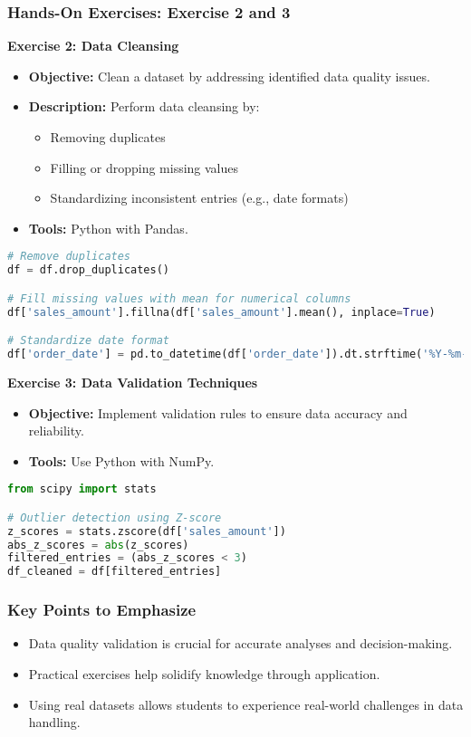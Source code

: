 \documentclass[aspectratio=169]{beamer}
\begin{document}
\begin{frame}[fragile]
    \frametitle{Hands-On Exercises: Exercise 2 and 3}
    \textbf{Exercise 2: Data Cleansing}
    \begin{itemize}
        \item \textbf{Objective:} Clean a dataset by addressing identified data quality issues.
        \item \textbf{Description:} Perform data cleansing by:
            \begin{itemize}
                \item Removing duplicates
                \item Filling or dropping missing values
                \item Standardizing inconsistent entries (e.g., date formats)
            \end{itemize}
        \item \textbf{Tools:} Python with Pandas.
    \end{itemize}
    \begin{lstlisting}[language=Python]
# Remove duplicates
df = df.drop_duplicates()

# Fill missing values with mean for numerical columns
df['sales_amount'].fillna(df['sales_amount'].mean(), inplace=True)

# Standardize date format
df['order_date'] = pd.to_datetime(df['order_date']).dt.strftime('%Y-%m-%d')
    \end{lstlisting}
    
    \textbf{Exercise 3: Data Validation Techniques}
    \begin{itemize}
        \item \textbf{Objective:} Implement validation rules to ensure data accuracy and reliability.
        \item \textbf{Tools:} Use Python with NumPy.
    \end{itemize}
    \begin{lstlisting}[language=Python]
from scipy import stats

# Outlier detection using Z-score
z_scores = stats.zscore(df['sales_amount'])
abs_z_scores = abs(z_scores)
filtered_entries = (abs_z_scores < 3)
df_cleaned = df[filtered_entries]
    \end{lstlisting}
\end{frame}

\begin{frame}
    \frametitle{Key Points to Emphasize}
    \begin{itemize}
        \item Data quality validation is crucial for accurate analyses and decision-making.
        \item Practical exercises help solidify knowledge through application.
        \item Using real datasets allows students to experience real-world challenges in data handling.
    \end{itemize}
\end{frame}
\end{document}
